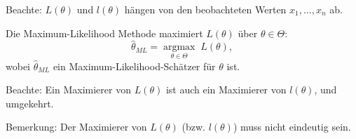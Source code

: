 \documentclass{tstextbook}
\begin{document}
\begin{remark}
	Beachte: $ L(\theta) $ und $ l(\theta) $ hängen von den beobachteten Werten $ x_1,\ldots,x_n $ ab.
\end{remark}

Die Maximum-Likelihood Methode  maximiert $ L(\theta) $ über $ \theta\in\Theta $: \\
\[
\hat{\theta}_{ML} = \underset{\theta\in\Theta}{\operatorname{argmax}} \; L(\theta),
\]
wobei $ \hat{\theta}_{ML} $ ein Maximum-Likelihood-Schätzer für $ \theta $ ist. 

\begin{remark}
	Beachte: Ein Maximierer von $ L(\theta) $ ist auch ein Maximierer von $ l(\theta) $, und umgekehrt.
\end{remark}

\begin{remark}
	Bemerkung: Der Maximierer von $ L(\theta) $ (bzw. $ l(\theta) $) muss nicht eindeutig sein.
\end{remark}
\end{document}
